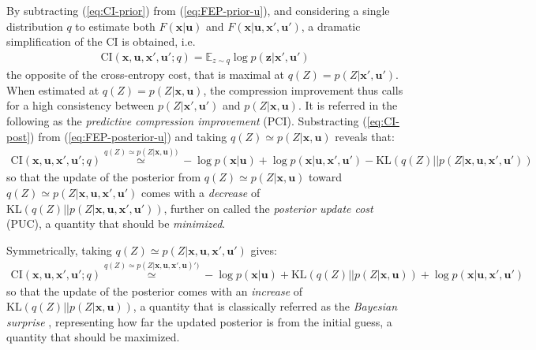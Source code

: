 \documentclass{article}
\begin{document}
By subtracting (\ref{eq:CI-prior}) from (\ref{eq:FEP-prior-u}), and considering a single distribution $q$ to estimate both $F(\boldsymbol{x}|\boldsymbol{u})$ and $F(\boldsymbol{x}|\boldsymbol{u}, \boldsymbol{x}', \boldsymbol{u}')$, a dramatic simplification of the CI is obtained, i.e. 
\begin{align}\text{CI}(\boldsymbol{x},\boldsymbol{u}, \boldsymbol{x}', \boldsymbol{u}';q) = \mathbb{E}_{z\sim q} \log p(\boldsymbol{z}|\boldsymbol{x}', \boldsymbol{u}')\label{eq:PCI}\end{align}
the opposite of the cross-entropy cost,
that is maximal at $q(Z) = p(Z|\boldsymbol{x}', \boldsymbol{u}')$. When estimated at $q(Z)= p(Z|\boldsymbol{x}, \boldsymbol{u})$, the 
compression improvement thus calls for a high consistency between $p(Z|\boldsymbol{x}', \boldsymbol{u}')$ and $p(Z|\boldsymbol{x}, \boldsymbol{u})$. It is referred in the following as the \emph{predictive compression improvement} (PCI).
Substracting (\ref{eq:CI-post}) from (\ref{eq:FEP-posterior-u}) and taking $q(Z) \simeq p(Z|\boldsymbol{x}, \boldsymbol{u})$ reveals that:
\begin{align}
\text{CI}(\boldsymbol{x},\boldsymbol{u}, \boldsymbol{x}', \boldsymbol{u}';q) \stackrel{q(Z) \simeq p(Z|\boldsymbol{x}, \boldsymbol{u}))}{\simeq}  
-\log p(\boldsymbol{x}| \boldsymbol{u}) 
+ \log p(\boldsymbol{x}| \boldsymbol{u}, \boldsymbol{x}', \boldsymbol{u}') - \text{KL}(q(Z)||p(Z|\boldsymbol{x}, \boldsymbol{u}, \boldsymbol{x}', \boldsymbol{u}'))
\end{align}
so that the update of the posterior from $q(Z)\simeq p(Z|\boldsymbol{x}, \boldsymbol{u})$ toward $q(Z)\simeq p(Z|\boldsymbol{x}, \boldsymbol{u}, \boldsymbol{x}', \boldsymbol{u}')$ comes with a \emph{decrease} of $\text{KL}(q(Z)||p(Z|\boldsymbol{x}, \boldsymbol{u}, \boldsymbol{x}', \boldsymbol{u}'))$, further on called the \emph{posterior update cost} (PUC), a quantity that should be \emph{minimized}.

Symmetrically, taking $q(Z) \simeq p(Z|\boldsymbol{x}, \boldsymbol{u},\boldsymbol{x}', \boldsymbol{u}')$ gives:
\begin{align}
 \text{CI}(\boldsymbol{x},\boldsymbol{u}, \boldsymbol{x}', \boldsymbol{u}'; q) \stackrel{q(Z) \simeq p(Z|\boldsymbol{x}, \boldsymbol{u},\boldsymbol{x}', \boldsymbol{u})')}{\simeq}  
 -\log p(\boldsymbol{x}| \boldsymbol{u}) 
 + \text{KL}(q(Z)||p(Z|\boldsymbol{x}, \boldsymbol{u}))
 + \log p(\boldsymbol{x}| \boldsymbol{u}, \boldsymbol{x}', \boldsymbol{u}') 
\end{align}
so that the update of the posterior comes with an \emph{increase} of $\text{KL}(q(Z)||p(Z|\boldsymbol{x}, \boldsymbol{u}))$, a quantity that is classically referred as the \emph{Bayesian surprise} \cite{itti2005bayesian}, representing how far the updated posterior is from the initial guess, a quantity that should be maximized.
\end{document}
